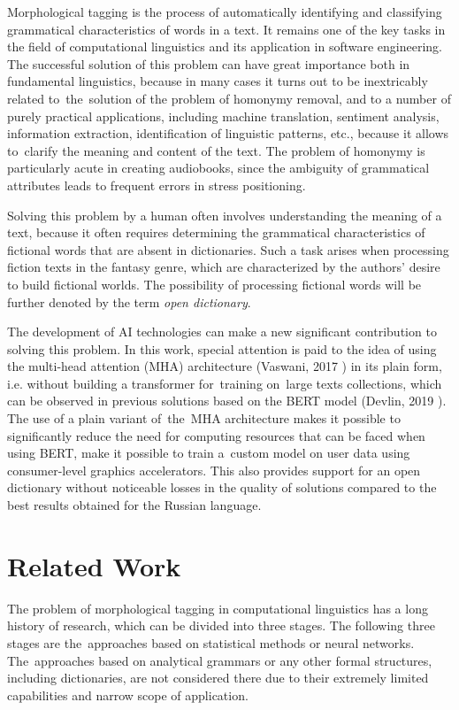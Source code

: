 \documentclass[11pt,twocolumn]{article}
\begin{document}
Morphological tagging is the process of automatically identifying and classifying grammatical characteristics of words in a text.
It remains one of the key tasks in the field of computational linguistics and its application in software engineering.
The successful solution of this problem can have great importance both in fundamental linguistics,
because in many cases it turns out to be inextricably related to~the~solution of the problem of homonymy removal,
and to a number of purely practical applications, including machine translation, sentiment analysis, information extraction, identification of linguistic patterns, etc.,
because it allows to~clarify the meaning and content of the text.
The problem of homonymy is particularly acute in creating audiobooks,
since the ambiguity of grammatical attributes leads to frequent errors in stress positioning.

Solving this problem by a human often involves understanding the meaning of a text,
because it often requires determining the grammatical characteristics of fictional words that are absent in dictionaries.
Such a task arises when processing fiction texts in the fantasy genre,
which are characterized by the authors' desire to build fictional worlds.
The possibility of processing fictional words will be further denoted by the term \textit{open dictionary}.

The development of AI technologies can make a new significant  contribution to solving this problem.
In this work, special attention is paid to the idea of using the multi-head attention (MHA) architecture (Vaswani, 2017 \cite{transformer}) in its plain form,
i.e. without building a transformer for~training on~large texts collections,
which can be observed in previous solutions based on the BERT model (Devlin, 2019 \cite{bert}).
The use of a plain variant of~the~MHA architecture makes it possible to significantly reduce the need for computing resources
that can be faced when using BERT,
make it possible to train a~custom model on user data using consumer-level graphics accelerators.
This also provides support for an open dictionary without noticeable losses in the quality of solutions compared to the best results
obtained for the Russian language.

\section{Related Work}

The problem of morphological tagging in computational linguistics has a long history of research,
which can be divided into three stages.
The following three stages are the~approaches based on statistical methods or neural networks.
The~approaches based on analytical grammars or any other formal structures, including dictionaries, are not considered there due to their extremely limited capabilities and narrow scope of application.
\end{document}
